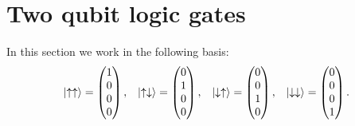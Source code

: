 \documentclass[11pt]{article}
\renewcommand{\d}{\partial} %
\newcommand{\m}[1]{\begin{pmatrix}#1\end{pmatrix}} %
\renewcommand{\u}{\uparrow}
\renewcommand{\d}{\downarrow}
\begin{document}
\newpage
\section*{Two qubit logic gates}

In this section we work in the following basis:
\begin{align}
  \ket{\u\u}=\m{1\\0\\0\\0}, && \ket{\u\d}=\m{0\\1\\0\\0}, &&
  \ket{\d\u}=\m{0\\0\\1\\0}, && \ket{\d\d}=\m{0\\0\\0\\1}.
\end{align}
\end{document}
